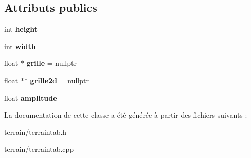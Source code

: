 \subsection*{Attributs publics}
\begin{DoxyCompactItemize}
\item 
\hypertarget{class_terrain_tab_a8213ff78ba0bae26a3ca0391166a5128}{}int {\bfseries height}\label{class_terrain_tab_a8213ff78ba0bae26a3ca0391166a5128}

\item 
\hypertarget{class_terrain_tab_a4cfde4817009ea768a1c071c00c2f1fd}{}int {\bfseries width}\label{class_terrain_tab_a4cfde4817009ea768a1c071c00c2f1fd}

\item 
\hypertarget{class_terrain_tab_a0b095b4aeb69aa00a75d543cd726e608}{}float $\ast$ {\bfseries grille} = nullptr\label{class_terrain_tab_a0b095b4aeb69aa00a75d543cd726e608}

\item 
\hypertarget{class_terrain_tab_a2a8a94257443114d929b94b87b382402}{}float $\ast$$\ast$ {\bfseries grille2d} = nullptr\label{class_terrain_tab_a2a8a94257443114d929b94b87b382402}

\item 
\hypertarget{class_terrain_tab_a46e3284a38c404d326323091628abf03}{}float {\bfseries amplitude}\label{class_terrain_tab_a46e3284a38c404d326323091628abf03}

\end{DoxyCompactItemize}


La documentation de cette classe a été générée à partir des fichiers suivants \+:\begin{DoxyCompactItemize}
\item 
terrain/terraintab.\+h\item 
terrain/terraintab.\+cpp\end{DoxyCompactItemize}
